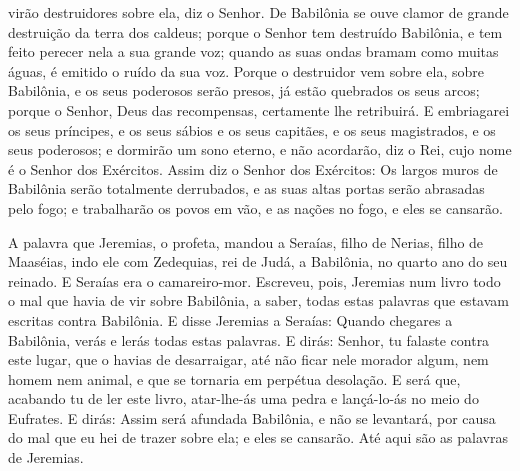 virão destruidores sobre ela, diz o Senhor. De Babilônia se
ouve clamor de grande destruição da terra dos caldeus; porque
o Senhor tem destruído Babilônia, e tem feito perecer nela a sua
grande voz; quando as suas ondas bramam como muitas águas, é emitido
o ruído da sua voz. Porque o destruidor vem sobre ela, sobre
Babilônia, e os seus poderosos serão presos, já estão quebrados os
seus arcos; porque o Senhor, Deus das recompensas, certamente lhe
retribuirá. E embriagarei os seus príncipes, e os seus sábios
e os seus capitães, e os seus magistrados, e os seus poderosos; e
dormirão um sono eterno, e não acordarão, diz o Rei, cujo nome é o
Senhor dos Exércitos. Assim diz o Senhor dos Exércitos: Os
largos muros de Babilônia serão totalmente derrubados, e as suas
altas portas serão abrasadas pelo fogo; e trabalharão os povos em
vão, e as nações no fogo, e eles se cansarão.

A palavra que Jeremias, o profeta, mandou a Seraías, filho de
Nerias, filho de Maaséias, indo ele com Zedequias, rei de Judá, a
Babilônia, no quarto ano do seu reinado. E Seraías era o
camareiro-mor. Escreveu, pois, Jeremias num livro todo o mal
que havia de vir sobre Babilônia, a saber, todas estas palavras que
estavam escritas contra Babilônia. E disse Jeremias a
Seraías: Quando chegares a Babilônia, verás e lerás todas estas
palavras. E dirás: Senhor, tu falaste contra este lugar, que
o havias de desarraigar, até não ficar nele morador algum, nem homem
nem animal, e que se tornaria em perpétua desolação. E será
que, acabando tu de ler este livro, atar-lhe-ás uma pedra e
lançá-lo-ás no meio do Eufrates. E dirás: Assim será afundada
Babilônia, e não se levantará, por causa do mal que eu hei de trazer
sobre ela; e eles se cansarão. Até aqui são as palavras de Jeremias.

\medskip

